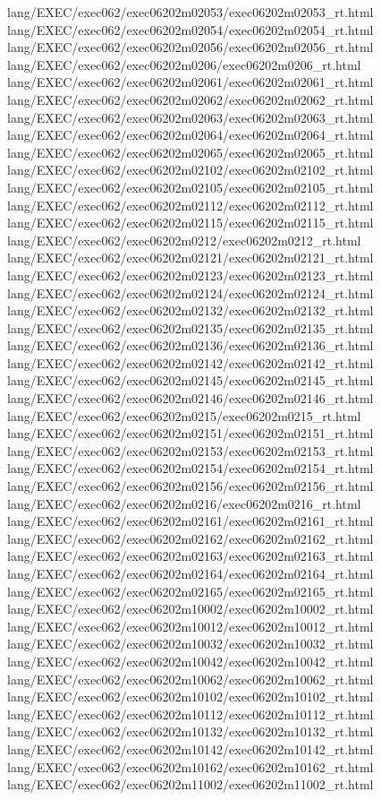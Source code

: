 lang/EXEC/exec062/exec06202m02053/exec06202m02053_rt.html
lang/EXEC/exec062/exec06202m02054/exec06202m02054_rt.html
lang/EXEC/exec062/exec06202m02056/exec06202m02056_rt.html
lang/EXEC/exec062/exec06202m0206/exec06202m0206_rt.html
lang/EXEC/exec062/exec06202m02061/exec06202m02061_rt.html
lang/EXEC/exec062/exec06202m02062/exec06202m02062_rt.html
lang/EXEC/exec062/exec06202m02063/exec06202m02063_rt.html
lang/EXEC/exec062/exec06202m02064/exec06202m02064_rt.html
lang/EXEC/exec062/exec06202m02065/exec06202m02065_rt.html
lang/EXEC/exec062/exec06202m02102/exec06202m02102_rt.html
lang/EXEC/exec062/exec06202m02105/exec06202m02105_rt.html
lang/EXEC/exec062/exec06202m02112/exec06202m02112_rt.html
lang/EXEC/exec062/exec06202m02115/exec06202m02115_rt.html
lang/EXEC/exec062/exec06202m0212/exec06202m0212_rt.html
lang/EXEC/exec062/exec06202m02121/exec06202m02121_rt.html
lang/EXEC/exec062/exec06202m02123/exec06202m02123_rt.html
lang/EXEC/exec062/exec06202m02124/exec06202m02124_rt.html
lang/EXEC/exec062/exec06202m02132/exec06202m02132_rt.html
lang/EXEC/exec062/exec06202m02135/exec06202m02135_rt.html
lang/EXEC/exec062/exec06202m02136/exec06202m02136_rt.html
lang/EXEC/exec062/exec06202m02142/exec06202m02142_rt.html
lang/EXEC/exec062/exec06202m02145/exec06202m02145_rt.html
lang/EXEC/exec062/exec06202m02146/exec06202m02146_rt.html
lang/EXEC/exec062/exec06202m0215/exec06202m0215_rt.html
lang/EXEC/exec062/exec06202m02151/exec06202m02151_rt.html
lang/EXEC/exec062/exec06202m02153/exec06202m02153_rt.html
lang/EXEC/exec062/exec06202m02154/exec06202m02154_rt.html
lang/EXEC/exec062/exec06202m02156/exec06202m02156_rt.html
lang/EXEC/exec062/exec06202m0216/exec06202m0216_rt.html
lang/EXEC/exec062/exec06202m02161/exec06202m02161_rt.html
lang/EXEC/exec062/exec06202m02162/exec06202m02162_rt.html
lang/EXEC/exec062/exec06202m02163/exec06202m02163_rt.html
lang/EXEC/exec062/exec06202m02164/exec06202m02164_rt.html
lang/EXEC/exec062/exec06202m02165/exec06202m02165_rt.html
lang/EXEC/exec062/exec06202m10002/exec06202m10002_rt.html
lang/EXEC/exec062/exec06202m10012/exec06202m10012_rt.html
lang/EXEC/exec062/exec06202m10032/exec06202m10032_rt.html
lang/EXEC/exec062/exec06202m10042/exec06202m10042_rt.html
lang/EXEC/exec062/exec06202m10062/exec06202m10062_rt.html
lang/EXEC/exec062/exec06202m10102/exec06202m10102_rt.html
lang/EXEC/exec062/exec06202m10112/exec06202m10112_rt.html
lang/EXEC/exec062/exec06202m10132/exec06202m10132_rt.html
lang/EXEC/exec062/exec06202m10142/exec06202m10142_rt.html
lang/EXEC/exec062/exec06202m10162/exec06202m10162_rt.html
lang/EXEC/exec062/exec06202m11002/exec06202m11002_rt.html
